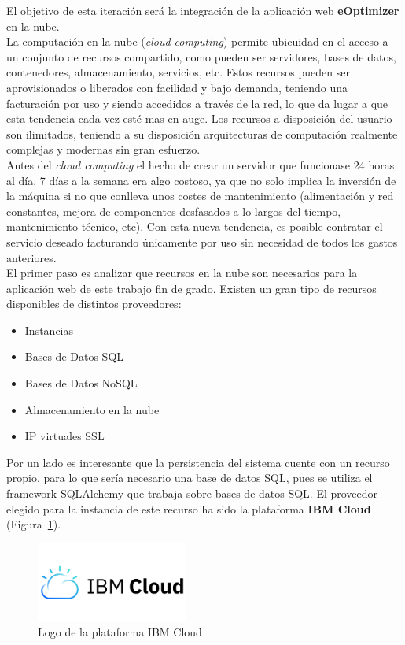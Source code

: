 El objetivo de esta iteración será la integración de la aplicación web \textbf{eOptimizer} en la nube.\\

La computación en la nube (\textit{cloud computing}) permite ubicuidad en el acceso a un conjunto de recursos compartido, como pueden ser servidores, bases de datos, contenedores, almacenamiento, servicios, etc. Estos recursos pueden ser aprovisionados o liberados con facilidad y bajo demanda, teniendo una facturación por uso y siendo accedidos a través de la red, lo que da lugar a que esta tendencia cada vez esté mas en auge. Los recursos a disposición del usuario son ilimitados, teniendo a su disposición arquitecturas de computación realmente complejas y modernas sin gran esfuerzo.\\
Antes del \textit{cloud computing} el hecho de crear un servidor que funcionase 24 horas al día, 7 días a la semana era algo costoso, ya que no solo implica la inversión de la máquina si no que conlleva unos costes de mantenimiento (alimentación y red constantes, mejora de componentes desfasados a lo largos del tiempo, mantenimiento técnico, etc). Con esta nueva tendencia, es posible contratar el servicio deseado facturando únicamente por uso sin necesidad de todos los gastos anteriores.\\

El primer paso es analizar que recursos en la nube son necesarios para la aplicación web de este trabajo fin de grado. Existen un gran tipo de recursos disponibles de distintos proveedores:
\begin{itemize}
\item Instancias
\item Bases de Datos SQL
\item Bases de Datos NoSQL
\item Almacenamiento en la nube
\item IP virtuales SSL
\end{itemize}

Por un lado es interesante que la persistencia del sistema cuente con un recurso propio, para lo que sería necesario una base de datos SQL, pues se utiliza el framework SQLAlchemy que trabaja sobre bases de datos SQL. El proveedor elegido para la instancia de este recurso ha sido la plataforma \textbf{IBM Cloud}~\cite{IMB} (Figura~\ref{fig:IBMCloud}).
\begin{figure}[H]
            \centering
            \includegraphics[width=5cm]{figs/ibm_logo.png}
            \caption{Logo de la plataforma IBM Cloud}
            \label{fig:IBMCloud}
\end{figure}

